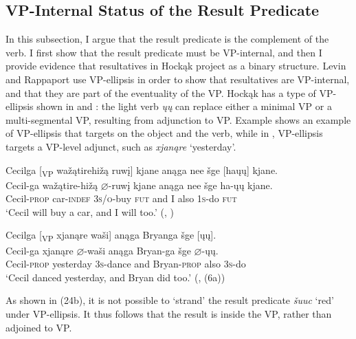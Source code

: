 \documentclass[output=paper]{LSP/langsci}
\begin{document}
\subsection{VP-Internal Status of the Result Predicate}

In this subsection, I argue that the result predicate is the complement of the verb. I first show that the result predicate must be VP-internal, and then I provide evidence that resultatives in Hockąk project as a binary structure. Levin and Rappaport \citet{Hovav1995} use VP-ellipsis in order to show that resultatives are VP-internal, and that they are part of the eventuality of the VP. Hockąk has a type of VP-ellipsis shown in  and : the light verb \textit{ųų} can replace either a minimal VP or a multi-segmental VP, resulting from adjunction to VP. Example  shows an example of VP-ellipsis that targets on the object and the verb, while in , VP-ellipsis targets a VP-level adjunct, such as \textit{xjanąre} `yesterday'.

\begin{exe}

\ex \glll Cecilga [\textsubscript{VP} wažątirehižą ruwį] kjane anąga nee šge [haųų] kjane.\\
Cecil-ga {} wažątire-hižą {$\varnothing$}-ruwį kjane anąga nee šge ha-ųų kjane.\\
Cecil-\textsc{prop} {} car-\textsc{indef} \textsc{3s/o}-buy \textsc{fut} and I also \textsc{1s}-do \textsc{fut}\\
\glt `Cecil will buy a car, and I will too.' (\citealt{Johnson2013}, )

\ex \glll Cecilga [\textsubscript{VP} xjanąre waši] anąga Bryanga šge [ųų].\\
Cecil-ga {} xjanąre {$\varnothing$}-waši anąga Bryan-ga šge {$\varnothing$}-ųų.\\
Cecil-\textsc{prop} {} yesterday \textsc{3s}-dance and Bryan-\textsc{prop} also \textsc{3s}-do\\
\glt `Cecil danced yesterday, and Bryan did too.' (\citealt{Johnson2013}, (6a))

\end{exe}

As shown in (24b), it is not possible to `strand' the result predicate \textit{šuuc} `red' under VP-ellipsis. It thus follows that the result is inside the VP, rather than adjoined to VP.
\end{document}
